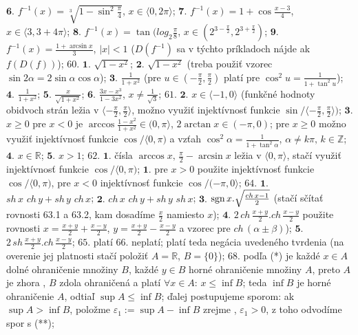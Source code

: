 $\boldsymbol{6.}$
$ f^{-1}(x)= \sqrt[3]{1- \sin ^{2} \frac{\pi}{4}} $, $ x \in \langle0, 2 \pi \rangle $;
$\boldsymbol{7.}$
$ f^{-1}(x)= 1+ \cos  \frac{x-3}{4} $, $ x \in \langle 3, 3+4 \pi \rangle $;
$\boldsymbol{8.}$
$ f^{-1}(x)= \tan (log _{2} \frac{\pi}{8} $, $ x \in ( 2^{3- \frac{\pi}{2}}, 2^{3+ \frac{\pi}{2}}) $;
$\boldsymbol{9.}$
$ f^{-1} (x) = \frac{1+ \arcsin x}{3}$, $ \vert x \vert<1  $ ($ D (f^{-1}) $ sa v týchto príkladoch nájde ak $ f(D(f)) $);
$\boxed{60.}$
$\boldsymbol{1.}$
$ \sqrt{1-x^{2}} $;
$\boldsymbol{2.}$
$ \sqrt{1-x^{2}} $ (treba použiť vzorec $ \sin 2 \alpha = 2 \sin \alpha \cos \alpha $);
$\boldsymbol{3.}$
$ \frac{1}{1+x^{2}} $ (pre $ u \in (-\frac{\pi}{2},\frac{\pi}{2} ) $ platí pre $ \cos ^{2 }u = \frac{1}{1+\tan^{2}u} $);
$\boldsymbol{4.}$
$ \frac{1}{1+x^{2}} $;
$\boldsymbol{5.}$
$ \frac{x}{\sqrt{1+x^{2}}} $;
$\boldsymbol{6.}$
$ \frac{3x-x^{3}}{1-3x^{2}} $, $ x \ne \frac{1}{\sqrt{3}} $;
$\boxed{61.}$
$\boldsymbol{2.}$
$ x \in \langle-1,0\rangle $ (funkčné hodnoty obidvoch strán ležia v $ \langle - \frac{\pi}{2},\frac{\pi}{2}\rangle  $, možno využiť injektívnosť funkcie $ \sin/\langle - \frac{\pi}{2},\frac{\pi}{2}\rangle ) $;
$\boldsymbol{3.}$
$ x\geq 0 $ pre $ x<0 $ je $ \arccos \frac{1-x^{2}}{1+x^{2}}  \in (0,\pi\rangle $, $ 2 \arctan x \in (-\pi,0) $; pre $ x\geq 0 $ možno využiť injektívnosť funkcie $ \cos/\langle0,\pi) $ a vzťah $ \cos^{2} \alpha = \frac{1}{1+ \tan^{2}\alpha} $, $ \alpha \ne k \pi, \, k \in \mathbb{Z} $;
$\boldsymbol{4.}$
$ x \in \mathbb{R} $;
$\boldsymbol{5.}$
$ x > 1 $;
$\boxed{62.}$
$\boldsymbol{1.}$
čísla $ \arccos x, \, \frac{\pi}{2}-\arcsin x $ ležia v $ \langle0, \pi\rangle $, stačí využiť injektívnosť funkcie $ \cos/\langle0,\pi) $;
$\boldsymbol{1.}$
pre $ x>0 $ použite injektívnosť funkcie $ \cos/\langle0,\pi) $, pre $ x<0 $  injektívnosť funkcie $ \cos/( -\pi,0\rangle $;
$\boxed{64.}$
$\boldsymbol{1.}$
$ sh \, x\,\, ch\, y + sh \,y\,\, ch\, x $;
$\boldsymbol{2.}$
$ ch \, x\,\, ch\, y + sh \,y\,\, sh\, x $;
$\boldsymbol{3.}$
$ \operatorname{sgn} x. \sqrt{\frac{ch\, x -1}{2}} $ (stačí sčítať rovnosti 63.1 a 63.2, kam dosadíme $ \frac{x}{2} $ namiesto $ x $);
$\boldsymbol{4.}$
$ 2 \, ch \, \frac{x+y}{2}. ch\, \frac{x-y}{2}$ použite rovnosti $ x= \frac{x+y}{2}+ \frac{x-y}{2} $,  $ y= \frac{x+y}{2}- \frac{x-y}{2} $ a  vzorec pre $ ch \, ( \alpha\pm \beta) $);
$\boldsymbol{5.}$
$ 2 \, sh \, \frac{x+y}{2}. ch\, \frac{x-y}{2}$;
$\boxed{65.}$
platí
$\boxed{66.}$
neplatí; platí teda negácia uvedeného tvrdenia (na overenie jej platnosti stačí položiť $ A = \mathbb{R} $, $ B= \lbrace0\rbrace $);
$\boxed{68.}$
podľa (*) je každé $ x\in A $ dolné ohraničenie množiny $ B $, každé $ y \in B $ horné ohraničenie  množiny $ A $, preto $ A $ je zhora , $ B $ zdola ohraničená a platí $ \forall x \in A: \, x\leq \inf B $; teda $ \inf B $ je horné ohraničenie $ A $, odtiaľ $ \sup A\leq \inf B $; ďalej postupujeme sporom: ak $ \sup A > \inf B $, položme $ \varepsilon_{1}:= \sup A - \inf B $  zrejme , $ \varepsilon_{1}>0 $, z toho odvodíme spor s (**);
